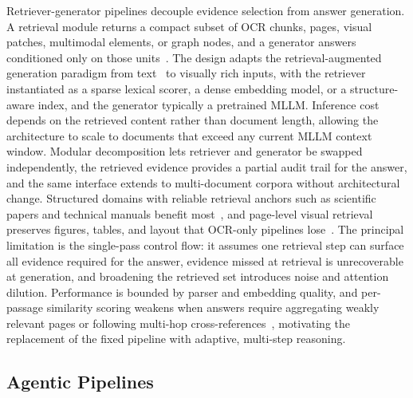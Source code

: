 \documentclass[11pt]{article}
\begin{document}
Retriever-generator pipelines decouple evidence selection from answer generation. A retrieval module returns a compact subset of OCR chunks, pages, visual patches, multimodal elements, or graph nodes, and a generator answers conditioned only on those units~\cite{cho2024m3docrag,tanaka2025vdocrag}. The design adapts the retrieval-augmented generation paradigm from text~\cite{lewis2020retrievalaugmented,guu2020realm} to visually rich inputs, with the retriever instantiated as a sparse lexical scorer, a dense embedding model, or a structure-aware index, and the generator typically a pretrained MLLM. Inference cost depends on the retrieved content rather than document length, allowing the architecture to scale to documents that exceed any current MLLM context window. Modular decomposition lets retriever and generator be swapped independently, the retrieved evidence provides a partial audit trail for the answer, and the same interface extends to multi-document corpora without architectural change. Structured domains with reliable retrieval anchors such as scientific papers and technical manuals benefit most~\cite{shin2025multidocfusion}, and page-level visual retrieval preserves figures, tables, and layout that OCR-only pipelines lose~\cite{tanaka2025vdocrag,xie2024wukong}. The principal limitation is the single-pass control flow: it assumes one retrieval step can surface all evidence required for the answer, evidence missed at retrieval is unrecoverable at generation, and broadening the retrieved set introduces noise and attention dilution. Performance is bounded by parser and embedding quality, and per-passage similarity scoring weakens when answers require aggregating weakly relevant pages or following multi-hop cross-references~\cite{wang2024knowledge,wu2025molorag}, motivating the replacement of the fixed pipeline with adaptive, multi-step reasoning.

\subsection{Agentic Pipelines}
\label{sec:arch-agent}
\end{document}
